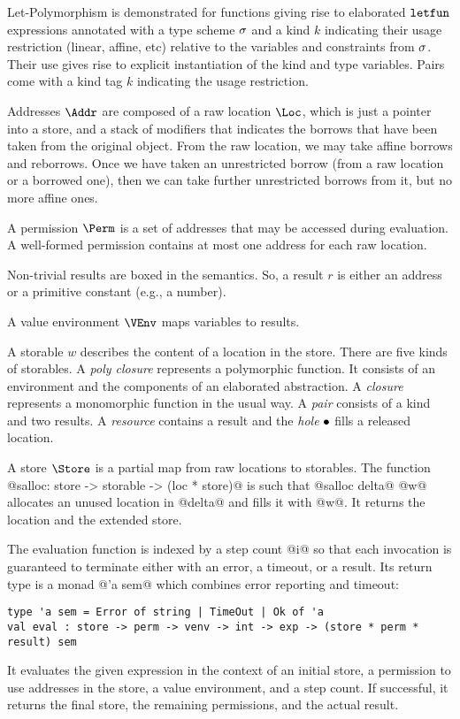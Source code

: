 Let-Polymorphism is demonstrated for functions giving rise to elaborated
$\mathtt{letfun}$ expressions annotated with a type scheme $\sigma$ and a kind $k$ indicating their
usage restriction (linear, affine, etc) relative to the variables and
constraints from $\sigma$. Their use
gives rise to explicit instantiation of the kind and type variables. Pairs
come with a kind tag $k$ indicating the usage restriction.

Addresses $\Addr$ are composed of a raw location $\Loc$, which is just
a pointer into a store, and a stack of modifiers that indicates the
borrows that have been taken from the original object. From the raw
location, we may take affine borrows and reborrows. Once we have
taken an unrestricted borrow (from a raw location or a borrowed one),
then we can take further unrestricted borrows from it, but no more
affine ones.

A permission $\Perm$ is a set of addresses that may be accessed during
evaluation. A well-formed permission contains at most one address for each raw
location.

Non-trivial results are boxed in the  semantics. So, a result
$r$ is either an address or a primitive constant (e.g., a number).

A value environment $\VEnv$  maps variables to results.

A storable $w$ describes the content of a location in the store. There are five
kinds of storables. A \emph{poly closure} represents a polymorphic
function. It consists of an environment and the components of an
elaborated abstraction. A \emph{closure} represents a monomorphic
function in the usual way. A \emph{pair}
consists of a kind and two results. A \emph{resource} contains
a result and the \emph{hole} $\bullet$ fills a released location.

A store $\Store$ is a partial map from raw locations to
storables. The function
@salloc: store -> storable -> (loc * store)@ is such that
@salloc delta@ @w@ allocates an unused location in @delta@ and fills it with
@w@. It returns the location and the extended store.


The evaluation function is indexed by a step count @i@ so that each
invocation is guaranteed to terminate either with an error, a timeout,
or a result. Its return type is a monad
@'a sem@ which combines error reporting and timeout:
\begin{lstlisting}
type 'a sem = Error of string | TimeOut | Ok of 'a
val eval : store -> perm -> venv -> int -> exp -> (store * perm * result) sem
\end{lstlisting}
It evaluates the given expression in the context of an initial store, a
permission to use addresses in the store, a value environment, and a
step count. If successful, it returns the final store, the remaining
permissions, and the actual result.

